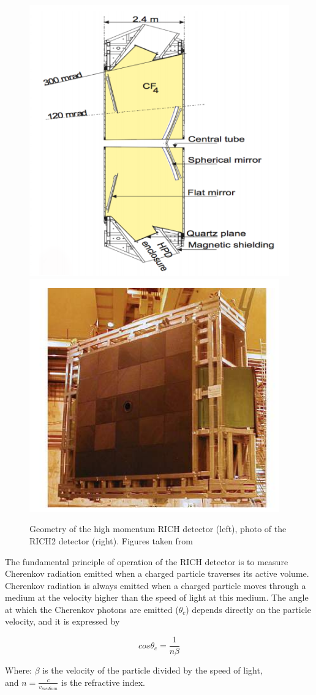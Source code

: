 \begin{figure}[h]
 \begin{center}
  \includegraphics[width=0.49\linewidth]{figures/RICH2.PNG}
   \includegraphics[width=0.49\linewidth]{figures/RICH2_photo.PNG}
    \caption{Geometry of the high momentum RICH detector (left), photo of the RICH2 detector (right). Figures taken from \cite{lhcb}}%
    \label{fig:RICH2}%
 \end{center}
\end{figure}

The fundamental principle of operation of the RICH detector is to measure Cherenkov radiation emitted when a charged particle traverses its active volume. Cherenkov radiation is always emitted when a charged particle moves through a medium at the velocity higher than the speed of light at this medium. The angle at which the Cherenkov photons are emitted ($\theta_c$) depends directly on the particle velocity, and it is expressed by

\begin{equation}
cos \theta_c = \frac{1}{n\beta}
\end{equation}

Where: $\beta$ is the velocity of the particle divided by the speed of light,\\ and $n = \frac{c}{v_{medium}}$
is the refractive index. 

